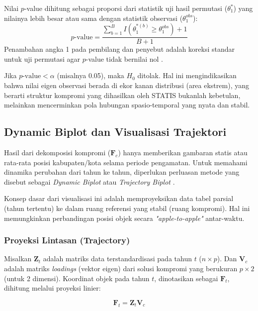 \documentclass[a4paper]{article}
\theoremstyle{definition} %
\begin{document}
\begin{enumerate}
    Nilai $p$-value dihitung sebagai proporsi dari statistik uji hasil permutasi ($\theta_1^*$) yang nilainya lebih besar atau sama dengan statistik observasi ($\theta_1^{obs}$):
    \begin{equation}
        p\text{-value} = \frac{\sum_{b=1}^{B} I(\theta_1^{*(b)} \ge \theta_1^{obs}) + 1}{B + 1}
    \end{equation}
    Penambahan angka 1 pada pembilang dan penyebut adalah koreksi standar untuk uji permutasi agar $p$-value tidak bernilai nol \citet{phipson2010}.
    
    Jika $p\text{-value} < \alpha$ (misalnya 0.05), maka $H_0$ ditolak. Hal ini mengindikasikan bahwa nilai eigen observasi berada di ekor kanan distribusi (area ekstrem), yang berarti struktur kompromi yang dihasilkan oleh STATIS bukanlah kebetulan, melainkan mencerminkan pola hubungan spasio-temporal yang nyata dan stabil.
    
\end{enumerate}

\subsection{Dynamic Biplot dan Visualisasi Trajektori}

Hasil dari dekomposisi kompromi ($\mathbf{F}_c$) hanya memberikan gambaran statis atau rata-rata posisi kabupaten/kota selama periode pengamatan. Untuk memahami dinamika perubahan dari tahun ke tahun, diperlukan perluasan metode yang disebut sebagai \textit{Dynamic Biplot} atau \textit{Trajectory Biplot} \citet{egido2015}.

Konsep dasar dari visualisasi ini adalah memproyeksikan data tabel parsial (tahun tertentu) ke dalam ruang referensi yang stabil (ruang kompromi). Hal ini memungkinkan perbandingan posisi objek secara \textit{"apple-to-apple"} antar-waktu.

\subsubsection{Proyeksi Lintasan (Trajectory)}

Misalkan $\mathbf{Z}_t$ adalah matriks data terstandardisasi pada tahun $t$ ($n \times p$). Dan $\mathbf{V}_c$ adalah matriks \textit{loadings} (vektor eigen) dari solusi kompromi yang berukuran $p \times 2$ (untuk 2 dimensi). Koordinat objek pada tahun $t$, dinotasikan sebagai $\mathbf{F}_t$, dihitung melalui proyeksi linier:

\begin{equation}
	\mathbf{F}_t = \mathbf{Z}_t \mathbf{V}_c
\end{equation}
\end{document}
